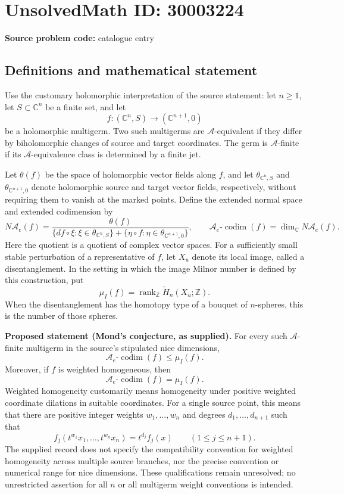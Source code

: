 \documentclass[11pt]{article}
\newcommand{\Z}{\mathbb{Z}}
\newcommand{\C}{\mathbb{C}}
\begin{document}
\section*{UnsolvedMath ID: 30003224}
\textbf{Source problem code:} catalogue entry
\subsection{Definitions and mathematical statement}
Use the customary holomorphic interpretation of the source statement: let \(n\geq 1\), let \(S\subset\C^n\) be a finite set, and let
\[
f:(\C^n,S)\longrightarrow(\C^{n+1},0)
\]
be a holomorphic multigerm. Two such multigerms are \(\mathcal A\)-equivalent if they differ by biholomorphic changes of source and target coordinates. The germ is \(\mathcal A\)-finite if its \(\mathcal A\)-equivalence class is determined by a finite jet.

Let \(\theta(f)\) be the space of holomorphic vector fields along \(f\), and let \(\theta_{\C^n,S}\) and \(\theta_{\C^{n+1},0}\) denote holomorphic source and target vector fields, respectively, without requiring them to vanish at the marked points. Define the extended normal space and extended codimension by
\[
N\mathcal A_e(f)=
\frac{\theta(f)}
{\{df\circ\xi:\xi\in\theta_{\C^n,S}\}
 +\{\eta\circ f:\eta\in\theta_{\C^{n+1},0}\}},
\qquad
\mathcal A_e\text{-}\operatorname{codim}(f)
=\dim_{\C}N\mathcal A_e(f).
\]
Here the quotient is a quotient of complex vector spaces. For a sufficiently small stable perturbation of a representative of \(f\), let \(X_u\) denote its local image, called a disentanglement. In the setting in which the image Milnor number is defined by this construction, put
\[
\mu_I(f)=\operatorname{rank}_{\Z}\widetilde H_n(X_u;\Z).
\]
When the disentanglement has the homotopy type of a bouquet of \(n\)-spheres, this is the number of those spheres.

\textbf{Proposed statement (Mond's conjecture, as supplied).}
For every such \(\mathcal A\)-finite multigerm in the source's stipulated nice dimensions,
\[
\mathcal A_e\text{-}\operatorname{codim}(f)\leq\mu_I(f).
\]
Moreover, if \(f\) is weighted homogeneous, then
\[
\mathcal A_e\text{-}\operatorname{codim}(f)=\mu_I(f).
\]
Weighted homogeneity customarily means homogeneity under positive weighted coordinate dilations in suitable coordinates. For a single source point, this means that there are positive integer weights \(w_1,\ldots,w_n\) and degrees \(d_1,\ldots,d_{n+1}\) such that
\[
f_j(t^{w_1}x_1,\ldots,t^{w_n}x_n)=t^{d_j}f_j(x)
\qquad(1\leq j\leq n+1).
\]
The supplied record does not specify the compatibility convention for weighted homogeneity across multiple source branches, nor the precise convention or numerical range for nice dimensions. These qualifications remain unresolved; no unrestricted assertion for all \(n\) or all multigerm weight conventions is intended.
\end{document}
